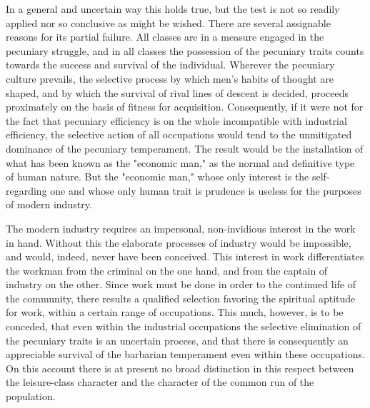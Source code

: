 \documentclass[12pt]{report}
\begin{document}
In a general and uncertain way this holds true, but the test is not so
readily applied nor so conclusive as might be wished. There are several
assignable reasons for its partial failure. All classes are in a measure
engaged in the pecuniary struggle, and in all classes the possession
of the pecuniary traits counts towards the success and survival of
the individual. Wherever the pecuniary culture prevails, the selective
process by which men's habits of thought are shaped, and by which the
survival of rival lines of descent is decided, proceeds proximately on
the basis of fitness for acquisition. Consequently, if it were not for
the fact that pecuniary efficiency is on the whole incompatible with
industrial efficiency, the selective action of all occupations would
tend to the unmitigated dominance of the pecuniary temperament. The
result would be the installation of what has been known as the "economic
man," as the normal and definitive type of human nature. But the
"economic man," whose only interest is the self-regarding one and whose
only human trait is prudence is useless for the purposes of modern
industry.

The modern industry requires an impersonal, non-invidious interest in
the work in hand. Without this the elaborate processes of industry
would be impossible, and would, indeed, never have been conceived. This
interest in work differentiates the workman from the criminal on the one
hand, and from the captain of industry on the other. Since work must be
done in order to the continued life of the community, there results a
qualified selection favoring the spiritual aptitude for work, within
a certain range of occupations. This much, however, is to be conceded,
that even within the industrial occupations the selective elimination
of the pecuniary traits is an uncertain process, and that there is
consequently an appreciable survival of the barbarian temperament even
within these occupations. On this account there is at present no broad
distinction in this respect between the leisure-class character and the
character of the common run of the population.
\end{document}
